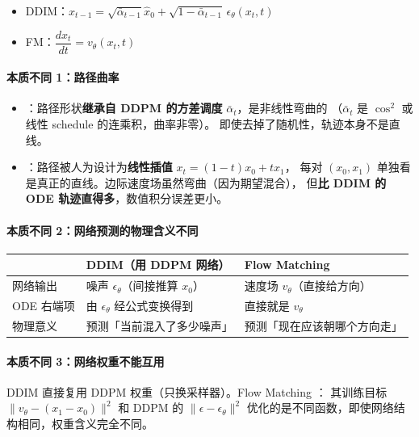 \begin{itemize}
  \item DDIM：$x_{t-1} = \sqrt{\bar{\alpha}_{t-1}}\hat{x}_0 + \sqrt{1-\bar{\alpha}_{t-1}}\,\epsilon_\theta(x_t,t)$
  \item FM：$\dfrac{dx_t}{dt} = v_\theta(x_t, t)$
\end{itemize}

\paragraph{本质不同 1：路径曲率}

\begin{itemize}
  \item {}：路径形状\textbf{继承自 DDPM 的方差调度} $\bar{\alpha}_t$，是非线性弯曲的
        （$\bar{\alpha}_t$ 是 $\cos^2$ 或线性 schedule 的连乘积，曲率非零）。
        即使去掉了随机性，轨迹本身不是直线。
  \item {}：路径被人为设计为\textbf{线性插值} $x_t = (1-t)x_0 + tx_1$，
        每对 $(x_0, x_1)$ 单独看是真正的直线。边际速度场虽然弯曲（因为期望混合），
        但\textbf{比 DDIM 的 ODE 轨迹直得多}，数值积分误差更小。
\end{itemize}

\paragraph{本质不同 2：网络预测的物理含义不同}

\begin{table}[h]
\centering
\renewcommand{\arraystretch}{1.3}
\begin{tabular}{lll}
\hline
 & \textbf{DDIM（用 DDPM 网络）} & \textbf{Flow Matching} \\
\hline
网络输出 & 噪声 $\epsilon_\theta$（间接推算 $x_0$） & 速度场 $v_\theta$（直接给方向） \\
ODE 右端项 & 由 $\epsilon_\theta$ 经公式变换得到 & 直接就是 $v_\theta$ \\
物理意义 & 预测「当前混入了多少噪声」 & 预测「现在应该朝哪个方向走」 \\
\hline
\end{tabular}
\end{table}

\paragraph{本质不同 3：网络权重不能互用}

DDIM 直接复用 DDPM 权重（只换采样器）。Flow Matching ：
其训练目标 $\|v_\theta - (x_1-x_0)\|^2$ 和 DDPM 的 $\|\epsilon - \epsilon_\theta\|^2$
优化的是不同函数，即使网络结构相同，权重含义完全不同。

